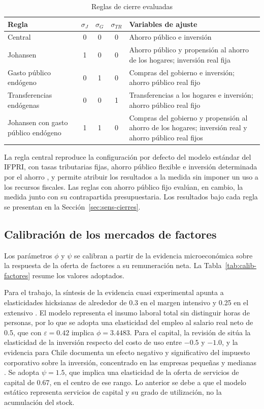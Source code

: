 \documentclass[11pt]{article}
\begin{document}
\begin{table}[H]
\centering
\caption{Reglas de cierre evaluadas}
\label{tab:reglas-cierre}
\small
\begin{tabular}{|p{3.6cm}|c|c|c|p{6.2cm}|}
  \hline
  Regla & $\sigma_{J}$ & $\sigma_{G}$ & $\sigma_{TR}$ & Variables de ajuste \\
  \hline
  Central & 0 & 0 & 0 & Ahorro público e inversión \\
  \hline
  Johansen & 1 & 0 & 0 & Ahorro público y propensión al ahorro de los hogares; inversión real fija \\
  \hline
  Gasto público endógeno & 0 & 1 & 0 & Compras del gobierno e inversión; ahorro público real fijo \\
  \hline
  Transferencias endógenas & 0 & 0 & 1 & Transferencias a los hogares e inversión; ahorro público real fijo \\
  \hline
  Johansen con gasto público endógeno & 1 & 1 & 0 & Compras del gobierno y propensión al ahorro de los hogares; inversión real y ahorro público real fijos \\
  \hline
\end{tabular}
\end{table}

La regla central reproduce la configuración por defecto del modelo estándar del IFPRI, con tasas tributarias fijas, ahorro público flexible e inversión determinada por el ahorro \cite{lofgren_harris_robinson_2002}, y permite atribuir los resultados a la medida sin imponer un uso a los recursos fiscales. Las reglas con ahorro público fijo evalúan, en cambio, la medida junto con su contrapartida presupuestaria. Los resultados bajo cada regla se presentan en la Sección~\ref{sec:sens-cierres}.


\subsection{Calibración de los mercados de factores}
\label{sec:calib-factores}

Los parámetros $\phi$ y $\psi$ se calibran a partir de la evidencia microeconómica sobre la respuesta de la oferta de factores a su remuneración neta. La Tabla~\ref{tab:calib-factores} resume los valores adoptados.

Para el trabajo, la síntesis de la evidencia cuasi experimental apunta a elasticidades hicksianas de alrededor de 0.3 en el margen intensivo y 0.25 en el extensivo \cite{chetty_etal_2011,chetty_2012}. El modelo representa el insumo laboral total sin distinguir horas de personas, por lo que se adopta una elasticidad del empleo al salario real neto de 0.5, que con $\varepsilon=0.42$ implica $\phi=3.4483$. Para el capital, la revisión de \cite{hassett_hubbard_2002} sitúa la elasticidad de la inversión respecto del costo de uso entre $-0.5$ y $-1.0$, y la evidencia para Chile documenta un efecto negativo y significativo del impuesto corporativo sobre la inversión, concentrado en las empresas pequeñas y medianas \cite{cerda_larrain_2005}. Se adopta $\psi=1.5$, que implica una elasticidad de la oferta de servicios de capital de 0.67, en el centro de ese rango. Lo anterior se debe a que el modelo estático representa servicios de capital y su grado de utilización, no la acumulación del stock.
\end{document}
